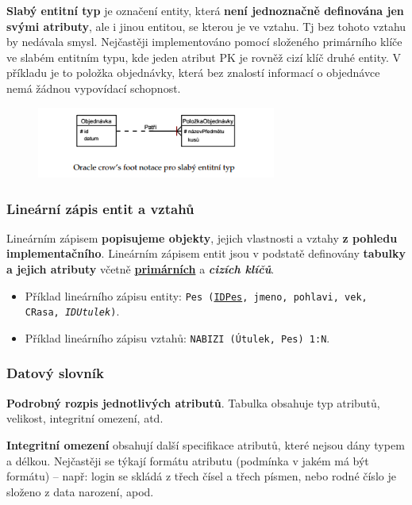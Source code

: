 \textbf{Slabý entitní typ} je označení entity, která \textbf{není jednoznačně definována jen svými atributy}, ale i jinou entitou, se kterou je ve vztahu. Tj bez tohoto vztahu by nedávala smysl. Nejčastěji implementováno pomocí složeného primárního klíče ve slabém entitním typu, kde jeden atribut PK je rovněž cizí klíč druhé entity. V příkladu je to položka objednávky, která bez znalostí informací o objednávce nemá žádnou vypovídací schopnost.

\begin{figure}[H]
	\centering
	\includegraphics[width=0.7\textwidth]{assets/erdiagram_slaby_entitni_typ.png}
\end{figure}

\subsubsection{Lineární zápis entit a vztahů}
Lineárním zápisem \textbf{popisujeme objekty}, jejich vlastnosti a vztahy \textbf{z pohledu implementačního}. Lineárním zápisem entit jsou v podstatě definovány \textbf{tabulky a jejich atributy} včetně \underline{\textbf{primárních}} a \textbf{\textit{cizích klíčů}}. 

\begin{itemize}
\item Příklad lineárního zápisu entity: \texttt{Pes (\underline{IDPes}, jmeno, pohlavi, vek, CRasa, \textit{IDUtulek})}.
\item Příklad lineárního zápisu vztahů: \texttt{NABIZI (Útulek, Pes) 1:N}.
\end{itemize}

\subsubsection{Datový slovník}
\textbf{Podrobný rozpis jednotlivých atributů}. Tabulka obsahuje typ atributů, velikost, integritní omezení, atd. 

\textbf{Integritní omezení} obsahují další specifikace atributů, které nejsou dány typem a délkou. Nejčastěji se týkají formátu atributu (podmínka v jakém má být formátu) -- např: login se skládá z třech čísel a třech písmen, nebo rodné číslo je složeno z data narození, apod.

